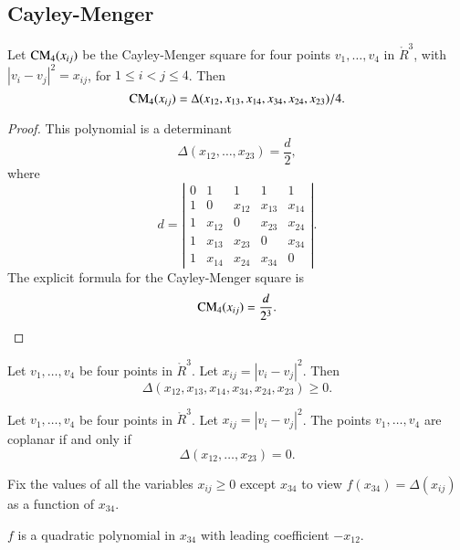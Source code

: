\subsection{Cayley-Menger}

\begin{lemma}
	Let ${\operatorname{CM}}_4(x_{ij})$ be the Cayley-Menger square for
four points $v_1,\ldots,v_4$ in $\ring{R}^3$, with $|v_i-v_j|^2 = x_{ij}$,
for $1\le i < j \le 4$.  Then
	$${\operatorname{CM}}_4(x_{ij}) = \Delta(x_{12},x_{13},x_{14},x_{34},x_{24},x_{23})/4.$$
\end{lemma}

\begin{proof}
This polynomial is a determinant  $$\Delta(x_{12},\ldots,x_{23}) = \frac{d}{2},$$
where $$
     d=\left|\begin{matrix}
     0 & 1 & 1 & 1 & 1\\
     1 & 0 & x_{12} & x_{13} & x_{14} \\
     1 & x_{12} & 0 & x_{23} & x_{24} \\
     1 & x_{13} & x_{23} & 0 & x_{34} \\
     1 & x_{14} & x_{24} & x_{34} & 0
  \end{matrix}\right|.
  $$
The explicit formula for the Cayley-Menger
square is
	$$
	{\operatorname{CM}}_4(x_{ij}) = \frac{d}{2^3}.
	$$
\end{proof}


\begin{lemma}
Let $v_1,\ldots,v_4$ be four points
in $\ring{R}^3$.  Let $x_{ij} = |v_i-v_j|^2$.  Then
	$$\Delta(x_{12},x_{13},x_{14},x_{34},x_{24},x_{23})\ge0.$$
\end{lemma}

\begin{lemma}
Let $v_1,\ldots,v_4$ be four points
in $\ring{R}^3$.  Let $x_{ij} = |v_i-v_j|^2$.
The points $v_1,\ldots,v_4$ are coplanar if and only if
	$$\Delta(x_{12},\ldots,x_{23}) = 0.$$
\end{lemma}

Fix the values of all the variables $x_{ij}\ge 0$ except
$x_{34}$ to view $f(x_{34})=\Delta(x_{ij})$ as a function of $x_{34}$.  %

\begin{lemma} 
$f$  is a quadratic
polynomial in $x_{34}$ with leading coefficient $-x_{12}$. 
\end{lemma}

